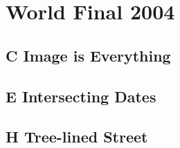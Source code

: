 \section{World Final 2004}
\subsection{C Image is Everything}
\raggedbottom
\hrulefill
\subsection{E Intersecting Dates}
\raggedbottom
\hrulefill
\subsection{H Tree-lined Street}
\raggedbottom
\hrulefill
